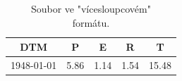 \documentclass[12pt,]{article}
\begin{document}
\begin{minipage}[c]{0.48\textwidth}
\begin{table}[H]
\begin{tabular}{|ccccc|}
  \hline
DTM & P & E & R & T \\ 
  \hline
1948-01-01 & 5.86 & 1.14 & 1.54 & 15.48 \\ 
   \hline
\end{tabular}
\vspace*{1.5mm}
\caption{Soubor ve "vícesloupcovém" \\ formátu.}
\label{tab3}
\vspace*{12mm}
\end{table}
\end{minipage}\begin{minipage}[c]{0.14\textwidth}
\inclu
\end{minipage}
\end{document}
